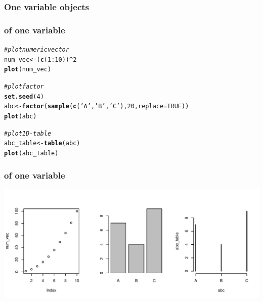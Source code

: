 \documentclass[12pt]{beamer}\usepackage[]{graphicx}\usepackage[]{color}
\makeatletter
\newcommand{\hlnum}[1]{\textcolor[rgb]{0.686,0.059,0.569}{#1}}%
\newcommand{\hlstr}[1]{\textcolor[rgb]{0.192,0.494,0.8}{#1}}%
\newcommand{\hlcom}[1]{\textcolor[rgb]{0.678,0.584,0.686}{\textit{#1}}}%
\newcommand{\hlopt}[1]{\textcolor[rgb]{0,0,0}{#1}}%
\newcommand{\hlstd}[1]{\textcolor[rgb]{0.345,0.345,0.345}{#1}}%
\newcommand{\hlkwb}[1]{\textcolor[rgb]{0.69,0.353,0.396}{#1}}%
\newcommand{\hlkwc}[1]{\textcolor[rgb]{0.333,0.667,0.333}{#1}}%
\newcommand{\hlkwd}[1]{\textcolor[rgb]{0.737,0.353,0.396}{\textbf{#1}}}%
\newenvironment{kframe}{%
 \def\at@end@of@kframe{}%
 \ifinner\ifhmode%
  \def\at@end@of@kframe{\end{minipage}}%
  \begin{minipage}{\columnwidth}%
 \fi\fi%
 \def\FrameCommand##1{\hskip\@totalleftmargin \hskip-\fboxsep
 \colorbox{shadecolor}{##1}\hskip-\fboxsep
     \hskip-\linewidth \hskip-\@totalleftmargin \hskip\columnwidth}%
 \MakeFramed {\advance\hsize-\width
   \@totalleftmargin\z@ \linewidth\hsize
   \@setminipage}}%
 {\par\unskip\endMakeFramed%
 \at@end@of@kframe}
\newenvironment{knitrout}{}{} %
\makeatother
\begin{document}

\begin{frame}
\frametitle{One variable objects}
\begin{center}
\end{center}
\end{frame}


\begin{frame}[fragile]
\frametitle{ of one variable}
\begin{knitrout}\footnotesize
{}\color{fgcolor}\begin{kframe}
\begin{alltt}
\hlcom{# plot numeric vector}
\hlstd{num_vec} \hlkwb{<-} \hlstd{(}\hlkwd{c}\hlstd{(}\hlnum{1}\hlopt{:}\hlnum{10}\hlstd{))}\hlopt{^}\hlnum{2}
\hlkwd{plot}\hlstd{(num_vec)}

\hlcom{# plot factor}
\hlkwd{set.seed}\hlstd{(}\hlnum{4}\hlstd{)}
\hlstd{abc} \hlkwb{<-} \hlkwd{factor}\hlstd{(}\hlkwd{sample}\hlstd{(}\hlkwd{c}\hlstd{(}\hlstr{'A'}\hlstd{,} \hlstr{'B'}\hlstd{,} \hlstr{'C'}\hlstd{),} \hlnum{20}\hlstd{,} \hlkwc{replace} \hlstd{=} \hlnum{TRUE}\hlstd{))}
\hlkwd{plot}\hlstd{(abc)}

\hlcom{# plot 1D-table}
\hlstd{abc_table} \hlkwb{<-} \hlkwd{table}\hlstd{(abc)}
\hlkwd{plot}\hlstd{(abc_table)}
\end{alltt}
\end{kframe}
\end{knitrout}
\end{frame}


\begin{frame}[fragile]
\frametitle{ of one variable}
\begin{knitrout}\footnotesize
{}\color{fgcolor}

{\centering \includegraphics[width=.9\linewidth,height=.5\linewidth]{figure/plot_single1-1} 

}



\end{knitrout}
\end{frame}
\end{document}
